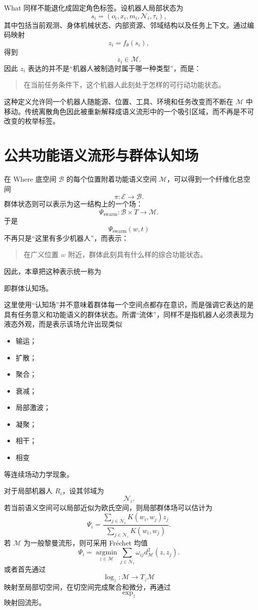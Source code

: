What 同样不能退化成固定角色标签。设机器人局部状态为
\[
s_i
=
(o_i,x_i,m_i,\mathcal N_i,\tau_i),
\]
其中包括当前观测、身体机械状态、内部资源、邻域结构以及任务上下文。通过编码映射
\[
z_i
=
f_\theta(s_i),
\]
得到
\[
z_i\in\mathcal M.
\]
因此 $z_i$ 表达的并不是“机器人被制造时属于哪一种类型”，而是：
\begin{quote}
在当前任务条件下，这个机器人此刻处于怎样的可行动功能状态。
\end{quote}

这种定义允许同一个机器人随能源、位置、工具、环境和任务改变而不断在 $\mathcal M$ 中移动。传统离散角色因此被重新解释成语义流形中的一个吸引区域，而不再是不可改变的枚举标签。


\section{公共功能语义流形与群体认知场}

在 Where 底空间 $\mathcal B$ 的每个位置附着功能语义空间 $\mathcal M$，可以得到一个纤维化总空间
\[
\pi:
\mathcal E
\rightarrow
\mathcal B.
\]
群体状态则可以表示为这一结构上的一个场：
\[
\Psi_{\mathrm{swarm}}:
\mathcal B\times T
\rightarrow
\mathcal M.
\]
于是
\[
\Psi_{\mathrm{swarm}}(w,t)
\]
不再只是“这里有多少机器人”，而表示：
\begin{quote}
在广义位置 $w$ 附近，群体此刻具有什么样的综合功能状态。
\end{quote}

因此，本章把这种表示统一称为
\begin{statementbox}
\centering
{}
\end{statementbox}
即群体认知场。

这里使用“认知场”并不意味着群体每一个空间点都存在意识，而是强调它表达的是具有任务意义和功能语义的群体状态。所谓“流体”，同样不是指机器人必须表现为液态外观，而是表示该场允许出现类似
\begin{itemize}
    \item 输运；
    \item 扩散；
    \item 聚合；
    \item 衰减；
    \item 局部激波；
    \item 凝聚；
    \item 相干；
    \item 相变
\end{itemize}
等连续场动力学现象。

对于局部机器人 $R_i$，设其邻域为
\[
\mathcal N_i.
\]
若当前语义空间可以局部近似为欧氏空间，则局部群体场可以估计为
\[
\Psi_i
=
\frac{
\sum_{j\in\mathcal N_i}
K(w_i,w_j)z_j
}{
\sum_{j\in\mathcal N_i}
K(w_i,w_j)
}.
\]
若 $\mathcal M$ 为一般黎曼流形，则可采用 Fr\'echet 均值
\[
\Psi_i
=
\operatorname*{argmin}_{z\in\mathcal M}
\sum_{j\in\mathcal N_i}
\omega_{ij}
d_{\mathcal M}^{2}(z,z_j).
\]
或者首先通过
\[
\log_{\bar z}:
\mathcal M
\rightarrow
T_{\bar z}\mathcal M
\]
映射至局部切空间，在切空间完成聚合和微分，再通过
\[
\exp_{\bar z}
\]
映射回流形。

